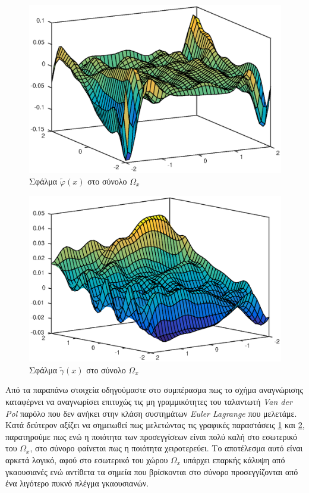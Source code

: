\begin{figure}
	\includegraphics{plots/experiments/vdp/phi_hat_error.eps}
	\caption{Σφάλμα $\tilde{\varphi}(x)$ στο σύνολο $\Omega_x$}
	\label{fig:vdp_phi_tilde}
\end{figure}

\begin{figure}
	\includegraphics{plots/experiments/vdp/gamma_hat_error.eps}
	\caption{Σφάλμα $\tilde{\gamma}(x)$ στο σύνολο $\Omega_x$}
	\label{fig:vdp_gamma_tilde}
\end{figure}

Από τα παραπάνω στοιχεία οδηγούμαστε στο συμπέρασμα πως το σχήμα αναγνώρισης καταφέρνει να αναγνωρίσει επιτυχώς τις μη γραμμικότητες του  ταλαντωτή \textit{Van der Pol} παρόλο που δεν ανήκει στην κλάση συστημάτων \textit{Euler Lagrange} που μελετάμε. Κατά δεύτερον αξίζει να σημειωθεί πως μελετώντας τις γραφικές παραστάσεις \ref{fig:vdp_phi_tilde} και \ref{fig:vdp_gamma_tilde}, παρατηρούμε πως ενώ η ποιότητα των προσεγγίσεων είναι πολύ καλή στο εσωτερικό του $\Omega_x$, στο σύνορο φαίνεται πως η ποιότητα χειροτερεύει. Το αποτέλεσμα αυτό είναι αρκετά λογικό, αφού στο εσωτερικό του χώρου $\Omega_x$ υπάρχει επαρκής κάλυψη από γκαουσιανές ενώ αντίθετα τα σημεία που βρίσκονται στο σύνορο προσεγγίζονται από ένα λιγότερο πυκνό πλέγμα γκαουσιανών.


